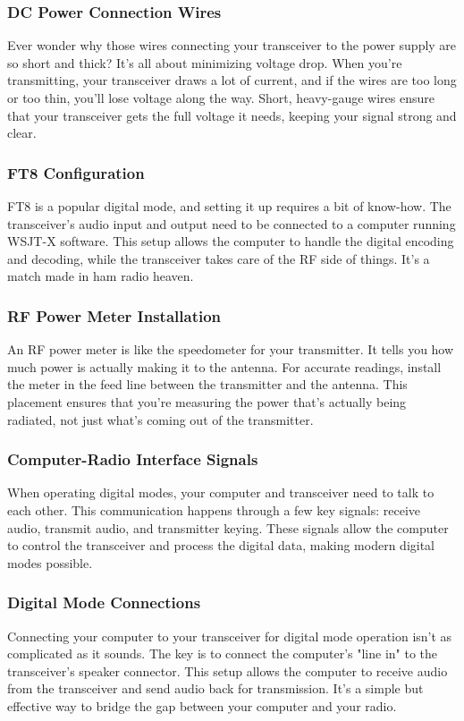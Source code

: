 \subsubsection*{DC Power Connection Wires}
Ever wonder why those wires connecting your transceiver to the power supply are so short and thick? It's all about minimizing voltage drop. When you're transmitting, your transceiver draws a lot of current, and if the wires are too long or too thin, you'll lose voltage along the way. Short, heavy-gauge wires ensure that your transceiver gets the full voltage it needs, keeping your signal strong and clear.

\subsubsection*{FT8 Configuration}
FT8 is a popular digital mode, and setting it up requires a bit of know-how. The transceiver's audio input and output need to be connected to a computer running WSJT-X software. This setup allows the computer to handle the digital encoding and decoding, while the transceiver takes care of the RF side of things. It's a match made in ham radio heaven.

\subsubsection*{RF Power Meter Installation}
An RF power meter is like the speedometer for your transmitter. It tells you how much power is actually making it to the antenna. For accurate readings, install the meter in the feed line between the transmitter and the antenna. This placement ensures that you're measuring the power that's actually being radiated, not just what's coming out of the transmitter.

\subsubsection*{Computer-Radio Interface Signals}
When operating digital modes, your computer and transceiver need to talk to each other. This communication happens through a few key signals: receive audio, transmit audio, and transmitter keying. These signals allow the computer to control the transceiver and process the digital data, making modern digital modes possible.

\subsubsection*{Digital Mode Connections}
Connecting your computer to your transceiver for digital mode operation isn't as complicated as it sounds. The key is to connect the computer's "line in" to the transceiver's speaker connector. This setup allows the computer to receive audio from the transceiver and send audio back for transmission. It's a simple but effective way to bridge the gap between your computer and your radio.

